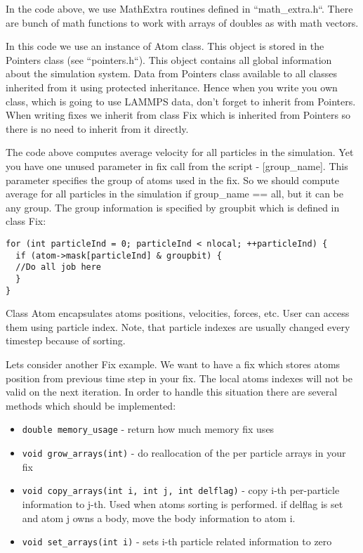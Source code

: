 \documentclass{article}
\begin{document}
In the code above, we use MathExtra routines defined in
``math\_extra.h``.  There are bunch of math functions to work with
arrays of doubles as with math vectors.

In this code we use an instance of Atom class. This object is stored
in the Pointers class (see ``pointers.h``). This object contains all
global information about the simulation system. Data from Pointers
class available to all classes inherited from it using protected
inheritance. Hence when you write you own class, which is going to use
LAMMPS data, don't forget to inherit from Pointers.  When writing
fixes we inherit from class Fix which is inherited from Pointers so
there is no need to inherit from it directly.

The code above computes average velocity for all particles in the
simulation.  Yet you have one unused parameter in fix call from the
script - [group\_name].  This parameter specifies the group of atoms
used in the fix. So we should compute average for all particles in the
simulation if group\_name == all, but it can be any group. The group
information is specified by groupbit which is defined in class Fix:

\begin{center}
\begin{verbatim}
for (int particleInd = 0; particleInd < nlocal; ++particleInd) {
  if (atom->mask[particleInd] & groupbit) {
  //Do all job here
  }
}
\end{verbatim}
\end{center}

Class Atom encapsulates atoms positions, velocities, forces, etc. User
can access them using particle index. Note, that particle indexes are
usually changed every timestep because of sorting.

Lets consider another Fix example. We want to have a fix which stores
atoms position from previous time step in your fix. The local atoms
indexes will not be valid on the next iteration. In order to handle
this situation there are several methods which should be implemented:

\begin{itemize}
\item \verb|double memory_usage| - return how much memory fix uses
\item \verb|void grow_arrays(int)| - do reallocation of the per particle arrays
  in your fix
\item \verb|void copy_arrays(int i, int j, int delflag)| - copy i-th per-particle
  information to j-th. Used when atoms sorting is performed. if delflag is set
  and atom j owns a body, move the body information to atom i.
\item \verb|void set_arrays(int i)| - sets i-th particle related information to zero
\end{itemize}
\end{document}
